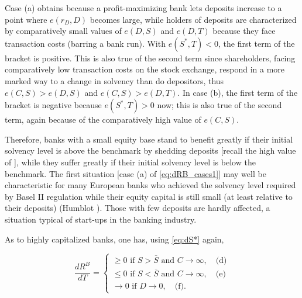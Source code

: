 Case (a) obtains because a profit-maximizing bank lets deposits increase to a point where $e(r_D,D)$ becomes large\footnotemark, while holders of deposits are characterized by comparatively small values of $e(D,S)$ and $e(D,T)$ because they face transaction costs (barring a bank run). With $e(S^*,T)<0$, the first term of the bracket is positive. This is also true of the second term since shareholders, facing comparatively low transaction costs on the stock exchange, respond in a more marked way to a change in solvency than do depositors, thus $e(C,S)>e(D,S)$ and $e(C,S)>e(D,T)$. In case (b), the first term of the bracket is negative because $e(S^*,T)>0$ now; this is also true of the second term, again because of the comparatively high value of $e(C,S)$.


Therefore, banks with a small equity base stand to benefit greatly if their initial solvency level is above the benchmark by shedding deposits [recall the high value of  ], while they suffer greatly if their initial solvency level is below the benchmark. The first situation [case (a) of \autoref{eq:dRB_cases1}] may well be characteristic for many European banks who achieved the solvency level required by Basel II regulation while their equity capital is still small (at least relative to their deposits) (Humblot \cite{Humblot2018TheImprove}). Those with few deposits are hardly affected, a situation typical of start-ups in the banking industry.

As to highly capitalized banks, one has, using \autoref{eq:dS*} again,

\begin{equation}
    \frac{d R^B}{d T}=\left\{\begin{array}{l}
    \geq 0 \text { if } S>\bar{S} \text { and } C \rightarrow \infty , \quad \text{(d)} \\
    \leq 0 \text { if } S<\bar{S} \text { and } C \rightarrow \infty , \quad \text{(e)} \\
    \rightarrow 0 \text { if } D \rightarrow 0 , \quad \text{(f)} .
    \end{array}\right. \label{eq:dRB_cases2}
\end{equation}


